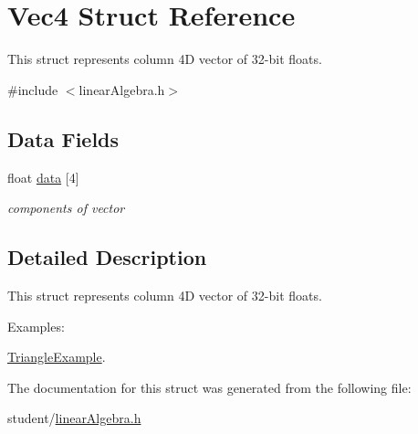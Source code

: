 \hypertarget{structVec4}{}\section{Vec4 Struct Reference}
\label{structVec4}


This struct represents column 4D vector of 32-\/bit floats.  




{\ttfamily \#include $<$linear\+Algebra.\+h$>$}

\subsection*{Data Fields}
\begin{DoxyCompactItemize}
\item 
float \hyperlink{structVec4_aee1e79a1c063cba1c01227258a5e1d9f}{data} \mbox{[}4\mbox{]}\hypertarget{structVec4_aee1e79a1c063cba1c01227258a5e1d9f}{}\label{structVec4_aee1e79a1c063cba1c01227258a5e1d9f}

\begin{DoxyCompactList}\small\item\em components of vector \end{DoxyCompactList}\end{DoxyCompactItemize}


\subsection{Detailed Description}
This struct represents column 4D vector of 32-\/bit floats. \begin{Desc}
\item[Examples\+: ]\par
\hyperlink{TriangleExample-example}{Triangle\+Example}.\end{Desc}


The documentation for this struct was generated from the following file\+:\begin{DoxyCompactItemize}
\item 
student/\hyperlink{linearAlgebra_8h}{linear\+Algebra.\+h}\end{DoxyCompactItemize}
